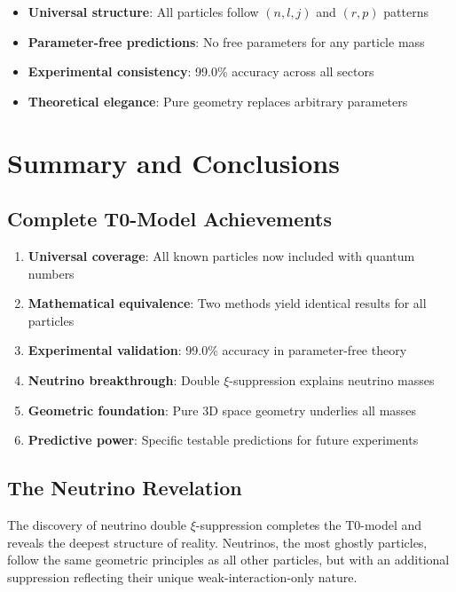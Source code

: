 \documentclass[12pt,a4paper]{article}
\begin{document}
	\begin{itemize}
		\item \textbf{Universal structure}: All particles follow $(n,l,j)$ and $(r,p)$ patterns
		\item \textbf{Parameter-free predictions}: No free parameters for any particle mass
		\item \textbf{Experimental consistency}: 99.0\% accuracy across all sectors
		\item \textbf{Theoretical elegance}: Pure geometry replaces arbitrary parameters
	\end{itemize}
	
	\section{Summary and Conclusions}
	\label{sec:summary_conclusions}
	
	\subsection{Complete T0-Model Achievements}
	\label{subsec:complete_achievements}
	
	\begin{enumerate}
		\item \textbf{Universal coverage}: All known particles now included with quantum numbers
		\item \textbf{Mathematical equivalence}: Two methods yield identical results for all particles
		\item \textbf{Experimental validation}: 99.0\% accuracy in parameter-free theory
		\item \textbf{Neutrino breakthrough}: Double $\xi$-suppression explains neutrino masses
		\item \textbf{Geometric foundation}: Pure 3D space geometry underlies all masses
		\item \textbf{Predictive power}: Specific testable predictions for future experiments
	\end{enumerate}
	
	\subsection{The Neutrino Revelation}
	\label{subsec:neutrino_revelation}
	
	The discovery of neutrino double $\xi$-suppression completes the T0-model and reveals the deepest structure of reality. Neutrinos, the most ghostly particles, follow the same geometric principles as all other particles, but with an additional suppression reflecting their unique weak-interaction-only nature.
	
\end{document}
